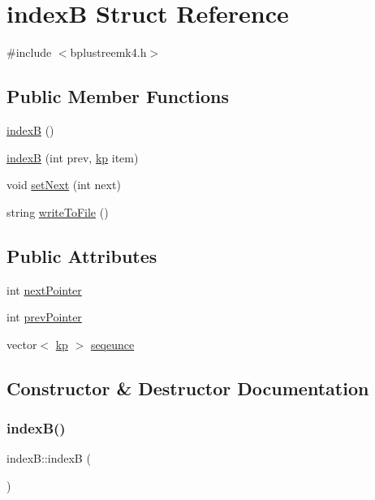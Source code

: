\hypertarget{structindex_b}{}\section{indexB Struct Reference}
\label{structindex_b}


{\ttfamily \#include $<$bplustreemk4.\+h$>$}

\subsection*{Public Member Functions}
\begin{DoxyCompactItemize}
\item 
\mbox{\hyperlink{structindex_b_acdb14c91565f0ff89aa74a6bc2734ca7}{indexB}} ()
\item 
\mbox{\hyperlink{structindex_b_a60b0f681a98c7a2aabdb9f0b3f5fd32c}{indexB}} (int prev, \mbox{\hyperlink{structkp}{kp}} item)
\item 
void \mbox{\hyperlink{structindex_b_aa49ce231339be0a86b0f56f217a90772}{set\+Next}} (int next)
\item 
string \mbox{\hyperlink{structindex_b_a66ee0af70d7b1a08658aee4cd7efb0cc}{write\+To\+File}} ()
\end{DoxyCompactItemize}
\subsection*{Public Attributes}
\begin{DoxyCompactItemize}
\item 
int \mbox{\hyperlink{structindex_b_a40845f21f1bf3ba1c5c64b1065283d97}{next\+Pointer}}
\item 
int \mbox{\hyperlink{structindex_b_a6281f24532b9dedfefe7e2a4ce86800c}{prev\+Pointer}}
\item 
vector$<$ \mbox{\hyperlink{structkp}{kp}} $>$ \mbox{\hyperlink{structindex_b_a2d8b28953bea6e6bdc221993ef60864a}{seqeunce}}
\end{DoxyCompactItemize}


\subsection{Constructor \& Destructor Documentation}
\mbox{\label{structindex_b_acdb14c91565f0ff89aa74a6bc2734ca7}} 
\subsubsection{\texorpdfstring{index\+B()}{indexB()}\hspace{0.1cm}{\footnotesize\ttfamily [1/2]}}
{\footnotesize\ttfamily index\+B\+::indexB (\begin{DoxyParamCaption}{ }\end{DoxyParamCaption})\hspace{0.3cm}{\ttfamily [inline]}}


